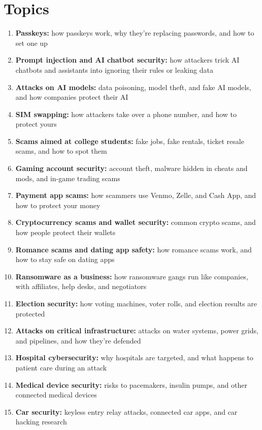 \documentclass[12pt]{article}
\begin{document}
\section*{Topics}
\begin{enumerate}
    \item \textbf{Passkeys:} how passkeys work, why they're replacing passwords, and how to set one up
    \item \textbf{Prompt injection and AI chatbot security:} how attackers trick AI chatbots and assistants into ignoring their rules or leaking data
    \item \textbf{Attacks on AI models:} data poisoning, model theft, and fake AI models, and how companies protect their AI
    \item \textbf{SIM swapping:} how attackers take over a phone number, and how to protect yours
    \item \textbf{Scams aimed at college students:} fake jobs, fake rentals, ticket resale scams, and how to spot them
    \item \textbf{Gaming account security:} account theft, malware hidden in cheats and mods, and in-game trading scams
    \item \textbf{Payment app scams:} how scammers use Venmo, Zelle, and Cash App, and how to protect your money
    \item \textbf{Cryptocurrency scams and wallet security:} common crypto scams, and how people protect their wallets
    \item \textbf{Romance scams and dating app safety:} how romance scams work, and how to stay safe on dating apps
    \item \textbf{Ransomware as a business:} how ransomware gangs run like companies, with affiliates, help desks, and negotiators
    \item \textbf{Election security:} how voting machines, voter rolls, and election results are protected
    \item \textbf{Attacks on critical infrastructure:} attacks on water systems, power grids, and pipelines, and how they're defended
    \item \textbf{Hospital cybersecurity:} why hospitals are targeted, and what happens to patient care during an attack
    \item \textbf{Medical device security:} risks to pacemakers, insulin pumps, and other connected medical devices
    \item \textbf{Car security:} keyless entry relay attacks, connected car apps, and car hacking research

\end{enumerate}
\end{document}
